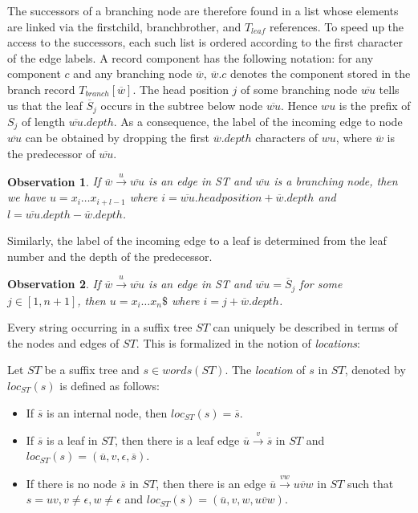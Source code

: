 \documentclass[conference]{IEEEtran}
\begin{document}
The successors of a branching node are therefore found in a list whose elements are linked via the firstchild, branchbrother, and $T_{leaf}$ references. To speed up the access to the successors, each such list is ordered according to the first character of the edge labels. A record component has the following notation: for any component $c$ and any branching node $\overline{w}$, $\overline{w}.c$ denotes the component stored in the branch record $T_{branch}[\overline{w}]$. The head position $j$ of some branching node $\overline{wu}$ tells us that the leaf $\overline{S}_{j}$ occurs in the subtree below node $\overline{wu}$. Hence $wu$ is the prefix of $S_{j}$ of length $\overline{wu}.depth$. As a consequence, the label of the incoming edge to node $\overline{wu}$ can be obtained by dropping the first $\overline{w}.depth$ characters of $wu$, where $\overline{w}$ is the predecessor of $\overline{wu}$.
\newtheorem{myobs}{Observation}

\begin{myobs}
If $\overline{w}\overset{u}{\rightarrow}\overline{wu}$ is an edge in ST and $\overline{wu}$ is a branching node, then we have $u=x_{i}\ldots x_{i+l-1}$ where $i=\overline{wu}.headposition+\overline{w}.depth$ and $l=\overline{wu}.depth-\overline{w}.depth$.
\end{myobs}

Similarly, the label of the incoming edge to a leaf is determined from the leaf number and the depth of the predecessor.

\begin{myobs}
If $\overline{w}\overset{u}{\rightarrow}\overline{wu}$ is an edge in ST and $\overline{wu}=\overline{S}_{j}$ for some $j \in \left[1,n+1\right]$, then $u=x_{i}\ldots x_{n}\$$ where $i=j+\overline{w}.depth$.
\end{myobs}

Every string occurring in a suffix tree $ST$ can uniquely be described in terms of the nodes and edges of $ST$. This is formalized in the notion of \textit{locations}:

\begin{mydef}
Let $ST$ be a suffix tree and $s \in words(ST)$. The \textit{location} of $s$ in $ST$, denoted by $loc_{ST}(s)$ is defined as follows:
\begin{itemize}
\item If $\overline{s}$ is an internal node, then $loc_{ST}(s)=\overline{s}$.
\item If $\overline{s}$ is a leaf in $ST$, then there is a leaf edge $\overline{u}\overset{v}{\rightarrow}\overline{s}$ in $ST$ and $loc_{ST}(s)=(\overline{u},v,\epsilon,\overline{s})$.
\item If there is no node $\overline{s}$ in $ST$, then there is an edge $\overline{u}\overset{vw}{\rightarrow}\overline{uvw}$ in $ST$ such that $s=uv, v\neq \epsilon, w\neq \epsilon$ and $loc_{ST}(s)=(\overline{u},v,w,\overline{uvw})$.
\end{itemize}
\end{mydef}
\end{document}
